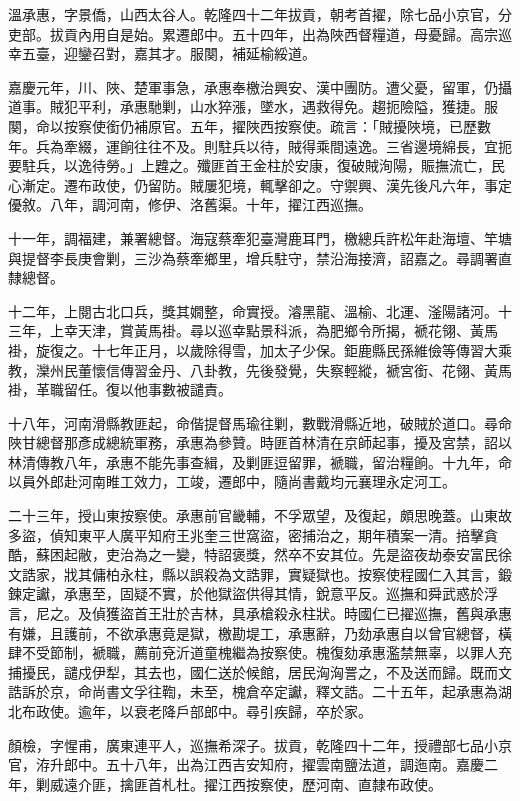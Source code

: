 \begin{pinyinscope}
溫承惠，字景僑，山西太谷人。乾隆四十二年拔貢，朝考首擢，除七品小京官，分吏部。拔貢內用自是始。累遷郎中。五十四年，出為陜西督糧道，母憂歸。高宗巡幸五臺，迎鑾召對，嘉其才。服闋，補延榆綏道。

嘉慶元年，川、陜、楚軍事急，承惠奉檄治興安、漢中團防。遭父憂，留軍，仍攝道事。賊犯平利，承惠馳剿，山水猝漲，墜水，遇救得免。趨扼險隘，獲捷。服闋，命以按察使銜仍補原官。五年，擢陜西按察使。疏言：「賊擾陜境，已歷數年。兵為牽綴，運餉往往不及。則駐兵以待，賊得乘間遠逸。三省邊境綿長，宜扼要駐兵，以逸待勞。」上韙之。殲匪首王金柱於安康，復破賊洵陽，賑撫流亡，民心漸定。遷布政使，仍留防。賊屢犯境，輒擊卻之。守禦興、漢先後凡六年，事定優敘。八年，調河南，修伊、洛舊渠。十年，擢江西巡撫。

十一年，調福建，兼署總督。海寇蔡牽犯臺灣鹿耳門，檄總兵許松年赴海壇、竿塘與提督李長庚會剿，三沙為蔡牽鄉里，增兵駐守，禁沿海接濟，詔嘉之。尋調署直隸總督。

十二年，上閱古北口兵，獎其嫺整，命實授。濬黑龍、溫榆、北運、滏陽諸河。十三年，上幸天津，賞黃馬褂。尋以巡幸點景科派，為肥鄉令所揭，褫花翎、黃馬褂，旋復之。十七年正月，以歲除得雪，加太子少保。鉅鹿縣民孫維儉等傳習大乘教，灤州民董懷信傳習金丹、八卦教，先後發覺，失察輕縱，褫宮銜、花翎、黃馬褂，革職留任。復以他事數被譴責。

十八年，河南滑縣教匪起，命偕提督馬瑜往剿，數戰滑縣近地，破賊於道口。尋命陜甘總督那彥成總統軍務，承惠為參贊。時匪首林清在京師起事，擾及宮禁，詔以林清傳教八年，承惠不能先事查緝，及剿匪逗留罪，褫職，留治糧餉。十九年，命以員外郎赴河南睢工效力，工竣，遷郎中，隨尚書戴均元襄理永定河工。

二十三年，授山東按察使。承惠前官畿輔，不孚眾望，及復起，頗思晚蓋。山東故多盜，偵知東平人廣平知府王兆奎三世窩盜，密捕治之，期年積案一清。掊擊貪酷，蘇困起敝，吏治為之一變，特詔褒獎，然卒不安其位。先是盜夜劫泰安富民徐文誥家，戕其傭柏永柱，縣以誤殺為文誥罪，實疑獄也。按察使程國仁入其言，鍛鍊定讞，承惠至，固疑不實，於他獄盜供得其情，銳意平反。巡撫和舜武惑於浮言，尼之。及偵獲盜首王壯於吉林，具承槍殺永柱狀。時國仁已擢巡撫，舊與承惠有嫌，且護前，不欲承惠竟是獄，檄勘堤工，承惠辭，乃劾承惠自以曾官總督，橫肆不受節制，褫職，薦前兗沂道童槐繼為按察使。槐復劾承惠濫禁無辜，以罪人充捕擾民，譴戍伊犁，其去也，國仁送於候館，居民洶洶詈之，不及送而歸。既而文誥訴於京，命尚書文孚往鞫，未至，槐倉卒定讞，釋文誥。二十五年，起承惠為湖北布政使。逾年，以衰老降戶部郎中。尋引疾歸，卒於家。

顏檢，字惺甫，廣東連平人，巡撫希深子。拔貢，乾隆四十二年，授禮部七品小京官，洊升郎中。五十八年，出為江西吉安知府，擢雲南鹽法道，調迤南。嘉慶二年，剿威遠介匪，擒匪首札杜。擢江西按察使，歷河南、直隸布政使。


\end{pinyinscope}
